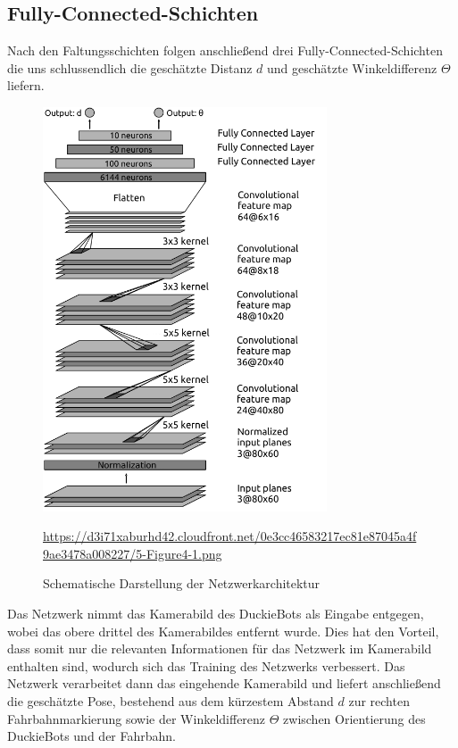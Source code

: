 \subsection{Fully-Connected-Schichten}

Nach den Faltungsschichten folgen anschließend drei Fully-Connected-Schichten die uns schlussendlich die geschätzte Distanz $d$ und geschätzte Winkeldifferenz $\Theta$ liefern.
\vspace{0.6cm}
\begin{figure}[H]
	\centering
	\includegraphics[width=0.75\textwidth]{kapitel4/images/network_architecture.png}
	\caption{Schematische Darstellung der Netzwerkarchitektur}
	\label{network-architecture}
	\vspace{0.2cm}
	\quelle\url{https://d3i71xaburhd42.cloudfront.net/0e3cc46583217ec81e87045a4f9ae3478a008227/5-Figure4-1.png}
\end{figure}

Das Netzwerk nimmt das Kamerabild des DuckieBots als Eingabe entgegen, wobei das obere drittel des Kamerabildes entfernt wurde. Dies hat den Vorteil, dass somit nur die relevanten Informationen für das Netzwerk im Kamerabild enthalten sind, wodurch sich das Training des Netzwerks verbessert. Das Netzwerk verarbeitet dann das eingehende Kamerabild und liefert anschließend die geschätzte Pose, bestehend aus dem kürzestem Abstand $d$ zur rechten Fahrbahnmarkierung sowie der Winkeldifferenz $\Theta$ zwischen Orientierung des DuckieBots und der Fahrbahn.


